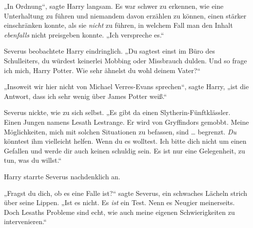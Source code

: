 „In Ordnung“, sagte Harry langsam. Es war schwer zu erkennen, wie eine Unterhaltung zu führen und niemandem davon erzählen zu können, einen stärker einschränken konnte, als sie \emph{nicht} zu führen, in welchem Fall man den Inhalt \emph{ebenfalls} nicht preisgeben konnte.
„Ich verspreche es.“

Severus beobachtete Harry eindringlich.
„Du sagtest einst im Büro des Schulleiters, du würdest keinerlei Mobbing oder Missbrauch dulden. Und so frage ich mich, Harry Potter. Wie sehr ähnelst du wohl deinem Vater?“

„Insoweit wir hier nicht von Michael Verres-Evans sprechen“, sagte Harry, „ist die Antwort, dass ich sehr wenig über James Potter weiß.“

Severus nickte, wie zu sich selbst.
„Es gibt da einen Slytherin-Fünftklässler. Einen Jungen namens Lesath Lestrange. Er wird von Gryffindors gemobbt. Meine Möglichkeiten, mich mit solchen Situationen zu befassen, sind … begrenzt. \emph{Du} könntest ihm vielleicht helfen. Wenn du es wolltest. Ich bitte dich nicht um einen Gefallen und werde dir auch keinen schuldig sein. Es ist nur eine Gelegenheit, zu tun, was du willst.“

Harry starrte Severus nachdenklich an.

„Fragst du dich, ob es eine Falle ist?“ sagte Severus, ein schwaches Lächeln strich über seine Lippen.
„Ist es nicht. Es \emph{ist} ein Test. Nenn es Neugier meinerseits. Doch Lesaths Probleme sind echt, wie auch meine eigenen Schwierigkeiten zu intervenieren.“

